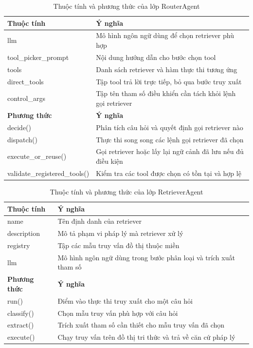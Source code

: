 \documentclass[../DoAn.tex]{subfiles}
\begin{document}
\begin{table}[H]
\centering
\small
\renewcommand{\arraystretch}{1.12}
\begin{tabular}{|p{4.8cm}|p{9.2cm}|}
\hline
\textbf{Thuộc tính} & \textbf{Ý nghĩa} \\ \hline
llm & Mô hình ngôn ngữ dùng để chọn retriever phù hợp \\ \hline
tool\_picker\_prompt & Nội dung hướng dẫn cho bước chọn tool \\ \hline
tools & Danh sách retriever và hàm thực thi tương ứng \\ \hline
direct\_tools & Tập tool trả lời trực tiếp, bỏ qua bước truy xuất \\ \hline
control\_args & Tập tên tham số điều khiển cần tách khỏi lệnh gọi retriever \\ \hline
\textbf{Phương thức} & \textbf{Ý nghĩa} \\ \hline
decide() & Phân tích câu hỏi và quyết định gọi retriever nào \\ \hline
dispatch() & Thực thi song song các lệnh gọi retriever đã chọn \\ \hline
execute\_or\_reuse() & Gọi retriever hoặc lấy lại ngữ cảnh đã lưu nếu đủ điều kiện \\ \hline
validate\_registered\_tools() & Kiểm tra các tool được chọn có tồn tại và hợp lệ \\ \hline
\end{tabular}
\caption{Thuộc tính và phương thức của lớp RouterAgent}
\label{tab:class-router-agent}
\end{table}

\begin{table}[H]
\centering
\small
\renewcommand{\arraystretch}{1.12}
\begin{tabular}{|p{4.8cm}|p{9.2cm}|}
\hline
\textbf{Thuộc tính} & \textbf{Ý nghĩa} \\ \hline
name & Tên định danh của retriever \\ \hline
description & Mô tả phạm vi pháp lý mà retriever xử lý \\ \hline
registry & Tập các mẫu truy vấn đồ thị thuộc miền \\ \hline
llm & Mô hình ngôn ngữ dùng trong bước phân loại và trích xuất tham số \\ \hline
\textbf{Phương thức} & \textbf{Ý nghĩa} \\ \hline
run() & Điểm vào thực thi truy xuất cho một câu hỏi \\ \hline
classify() & Chọn mẫu truy vấn phù hợp với câu hỏi \\ \hline
extract() & Trích xuất tham số cần thiết cho mẫu truy vấn đã chọn \\ \hline
execute() & Chạy truy vấn trên đồ thị tri thức và trả về căn cứ pháp lý \\ \hline
\end{tabular}
\caption{Thuộc tính và phương thức của lớp RetrieverAgent}
\label{tab:class-retriever-agent}
\end{table}
\end{document}
